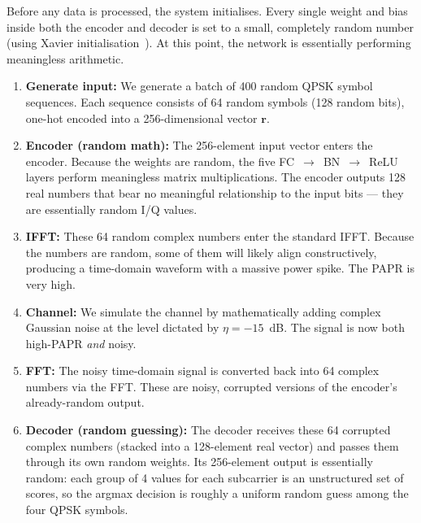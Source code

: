 Before any data is processed, the system initialises.  Every single weight
and bias inside both the encoder and decoder is set to a small, completely
random number (using Xavier initialisation~\cite{kim2017novel}).  At this
point, the network is essentially performing meaningless arithmetic.

\begin{enumerate}
    \item \textbf{Generate input:}
          We generate a batch of 400 random QPSK symbol sequences.
          Each sequence consists of 64 random symbols (128 random bits),
          one-hot encoded into a 256-dimensional vector $\bm{r}$.

    \item \textbf{Encoder (random math):}
          The 256-element input vector enters the encoder.  Because the
          weights are random, the five FC~$\to$~BN~$\to$~ReLU layers
          perform meaningless matrix multiplications.  The encoder outputs
          128 real numbers that bear no meaningful relationship to the
          input bits --- they are essentially random I/Q values.

    \item \textbf{IFFT:}
          These 64 random complex numbers enter the standard IFFT.
          Because the numbers are random, some of them will likely
          align constructively, producing a time-domain waveform
          with a massive power spike.  The PAPR is very high.

    \item \textbf{Channel:}
          We simulate the channel by mathematically adding complex
          Gaussian noise at the level dictated by $\eta = -15$~dB.
          The signal is now both high-PAPR \emph{and} noisy.

    \item \textbf{FFT:}
          The noisy time-domain signal is converted back into 64
          complex numbers via the FFT.  These are noisy, corrupted
          versions of the encoder's already-random output.

    \item \textbf{Decoder (random guessing):}
          The decoder receives these 64 corrupted complex numbers
          (stacked into a 128-element real vector) and passes them
          through its own random weights.  Its 256-element output
          is essentially random: each group of 4 values for each
          subcarrier is an unstructured set of scores, so the argmax
          decision is roughly a uniform random guess among the four
          QPSK symbols.


\end{enumerate}
